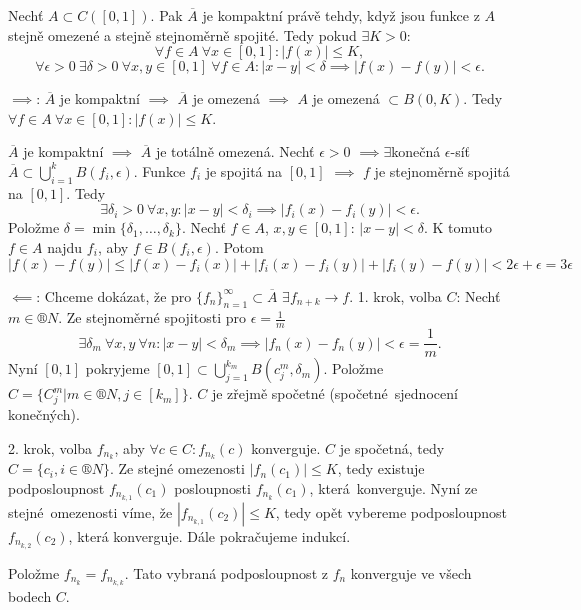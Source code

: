 \documentclass[12pt]{article}					%
\begin{document}
		\begin{veta}
			Nechť $A \subset C([0, 1])$. Pak $\overline{A}$ je kompaktní právě tehdy, když jsou funkce z $A$ stejně omezené a stejně stejnoměrně spojité. Tedy pokud $\exists K > 0$:
			$$ \forall f \in A\ \forall x \in [0, 1]: |f(x)| ≤ K, $$
			$$ \forall \epsilon > 0\ \exists \delta > 0\ \forall x, y \in [0, 1]\ \forall f \in A: |x - y| < \delta \implies |f(x) - f(y)| < \epsilon. $$

			\begin{dukazin}
				$\implies$: $\overline{A}$ je kompaktní $\implies$ $\overline{A}$ je omezená $\implies$ $A$ je omezená $\subset B(0, K)$. Tedy $\forall f \in A\ \forall x \in [0, 1]: |f(x)| ≤ K$.

				$\overline{A}$ je kompaktní $\implies$ $\overline{A}$ je totálně omezená. Nechť $\epsilon > 0$ $\implies \exists$konečná $\epsilon$-síť $\overline{A} \subset \bigcup_{i = 1}^k B(f_i, \epsilon)$. Funkce $f_i$ je spojitá na $[0, 1]$ $\implies$ $f$ je stejnoměrně spojitá na $[0, 1]$. Tedy
				$$ \exists \delta_i>0\ \forall x, y: |x - y| < \delta_i \implies |f_i(x) - f_i(y)| < \epsilon. $$
				Položme $\delta = \min\{\delta_1, …, \delta_k\}$. Nechť $f \in A$, $x, y \in [0, 1]$: $|x - y| < \delta$. K tomuto $f \in A$ najdu $f_i$, aby $f \in B(f_i, \epsilon)$. Potom
				$$ |f(x) - f(y)| ≤ |f(x) - f_i(x)| + |f_i(x) - f_i(y)| + |f_i(y) - f(y)| < 2\epsilon + \epsilon = 3\epsilon $$


				$\impliedby$: Chceme dokázat, že pro $\{f_n\}_{n=1}^∞ \subset \overline{A}$ $\exists f_{n + k} \rightarrow f$. 1. krok, volba $C$: Nechť $m \in ®N$. Ze stejnoměrné spojitosti pro $\epsilon = \frac{1}{m}$
				$$ \exists \delta_m\ \forall x, y\ \forall n: |x - y| < \delta_m \implies |f_n(x) - f_n(y)| < \epsilon = \frac{1}{m}. $$
				Nyní $[0, 1]$ pokryjeme $[0, 1] \subset \bigcup_{j=1}^{k_m} B(c_{j}^m, \delta_m)$. Položme $C = \{C_j^m | m \in ®N, j \in [k_{m}]\}$. $C$ je zřejmě spočetné (spočetné sjednocení konečných).

				2. krok, volba $f_{n_k}$, aby $\forall c \in C: f_{n_k}(c)$ konverguje. $C$ je spočetná, tedy $C = \{c_i, i \in ®N\}$. Ze stejné omezenosti $|f_n(c_1)| ≤ K$, tedy existuje podposloupnost $f_{n_{k, 1}}(c_1)$ posloupnosti $f_{n_k}(c_1)$, která konverguje. Nyní ze stejné omezenosti víme, že $|f_{n_{k, 1}}(c_2)| ≤ K$, tedy opět vybereme podposloupnost $f_{n_{k, 2}}(c_2)$, která konverguje. Dále pokračujeme indukcí.

				Položme $f_{n_k} = f_{n_{k, k}}$. Tato vybraná podposloupnost z $f_n$ konverguje ve všech bodech $C$.


\end{dukazin}
\end{veta}
\end{document}
